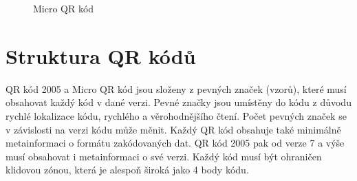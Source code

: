 \begin{figure}[H]
  \begin{center}
    \caption{Micro QR kód}
    \label{microQRIntroducion}
  \end{center}
\end{figure}

\section{Struktura QR kódů}
\label{strukturaQRKodu}

QR kód 2005 a Micro QR kód jsou složeny z pevných značek (vzorů), které musí
obsahovat každý kód v dané verzi. Pevné značky jsou umístěny do kódu z důvodu 
rychlé lokalizace kódu, rychlého a věrohodnějšího čtení. Počet pevných značek 
se v závislosti na verzi kódu může měnit. Každý QR kód obsahuje také minimálně
metainformaci o formátu zakódovaných dat. QR kód 2005 pak od verze 7 a výše 
musí obsahovat i metainformaci o své verzi. Každý kód musí být ohraničen 
klidovou zónou, která je alespoň široká jako 4 body kódu.

